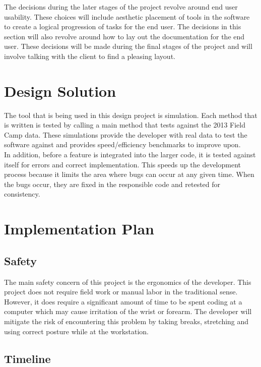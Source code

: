 \documentclass[12pt]{article}
\begin{document}
The decisions during the later stages of the project revolve around end user usability. These choices will include aesthetic placement of tools in the software to create a logical progression of tasks for the end user. The decisions in this section will also revolve around how to lay out the documentation for the end user. These decisions will be made during the final stages of the project and will involve talking with the client to find a pleasing layout. \\

\section{Design Solution}

The tool that is being used in this design project is simulation. Each method that is written is tested by calling a main method that tests against the 2013 Field Camp data. These simulations provide the developer with real data to test the software against and provides speed/efficiency benchmarks to improve upon. \\

In addition, before a feature is integrated into the larger code, it is tested against itself for errors and correct implementation. This speeds up the development process because it limits the area where bugs can occur at any given time. When the bugs occur, they are fixed in the responsible code and retested for consistency.

\section{Implementation Plan}
\subsection{Safety}

The main safety concern of this project is the ergonomics of the developer. This project does not require field work or manual labor in the traditional sense. However, it does require a significant amount of time to be spent coding at a computer which may cause irritation of the wrist or forearm. The developer will mitigate the risk of encountering this problem by taking breaks, stretching and using correct posture while at the workstation.

\subsection{Timeline}
\end{document}
